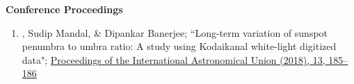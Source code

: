 \begin{center}{\huge\bf Conference Proceedings}\end{center}
\begin{enumerate}
    \item {}, Sudip Mandal, \& Dipankar Banerjee; ``Long-term variation of sunspot penumbra to umbra ratio: A study using Kodaikanal white-light digitized data"; \href{https://doi.org/10.1017/S1743921318001989}{ Proceedings of the International Astronomical Union (2018), 13, 185–186}
\end{enumerate}

\clearpage 
\pagestyle{empty}
